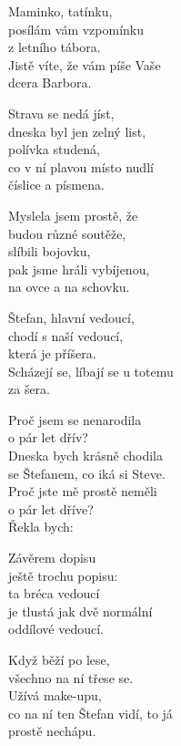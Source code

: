 
\ve{}
Maminko, tatínku,\\
posílám vám vzpomínku\\
z letního tábora.\\
Jistě víte, že vám píše Vaše\\
dcera Barbora.

\ve{}
Strava se nedá jíst,\\
dneska byl jen zelný list,\\
polívka studená,\\
co v ní plavou místo nudlí\\
číslice a písmena.

\ve{}
Myslela jsem prostě, že\\
budou různé soutěže,\\
slíbili bojovku,\\
pak jsme hráli vybíjenou,\\
na ovce a na schovku.

\ve{}
Štefan, hlavní vedoucí,\\
chodí s naší vedoucí,\\
která je příšera.\\
Scházejí se, líbají se u totemu\\
za šera.

\cho{}
Proč jsem se nenarodila\\
o pár let dřív?\\
Dneska bych krásně chodila\\
se Štefanem, co iká si Steve.\\
Proč jste mě prostě neměli\\
o pár let dříve?\\
Řekla bych: 

\ve{}
Závěrem dopisu\\
ještě trochu popisu:\\
ta bréca vedoucí\\
je tlustá jak dvě normální\\
oddílové vedoucí.

\ve{}
Když běží po lese,\\
všechno na ní třese se.\\
Užívá make-upu,\\
co na ní ten Štefan vidí, to já\\
prostě nechápu.

